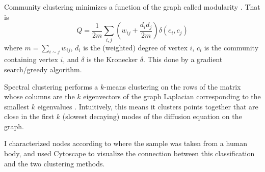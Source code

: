 \documentclass[10pt]{article}
\theoremstyle{definition}
\numberwithin{theorem}{section}
\numberwithin{definition}{section}
\numberwithin{lemma}{section}
\numberwithin{corollary}{section}
\numberwithin{clm}{section}
\numberwithin{rmk}{section}
\begin{document}
Community clustering minimizes a function of the graph called modularity \cite{PhysRevE.70.066111}\cite{PhysRevE.70.056131}. That is 
\[
Q = \frac{1}{2m}\sum_{i,j}\left(w_{ij} + \frac{d_id_j}{2m}\right) \delta(c_i,c_j)
\]
where $m = \sum_{i\sim j} w_{ij}$, $d_i$ is the (weighted) degree of vertex $i$, $c_i$ is the community containing vertex $i$, and $\delta$ is the Kronecker $\delta$. This done by a gradient search/greedy algorithm.

Spectral clustering performs a $k$-means clustering on the rows of the matrix whose columns are the $k$ eigenvectors of the graph Laplacian corresponding to the smallest $k$ eigenvalues \cite{vonLuxburg2007} . Intuitively, this means it clusters points together that are close in the first $k$ (slowest decaying) modes of the diffusion equation on the graph. 

I characterized nodes according to where the sample was taken from a human body, and used Cytoscape \cite{cyotscape} to visualize the connection between this classification and the two clustering methods.
\end{document}
